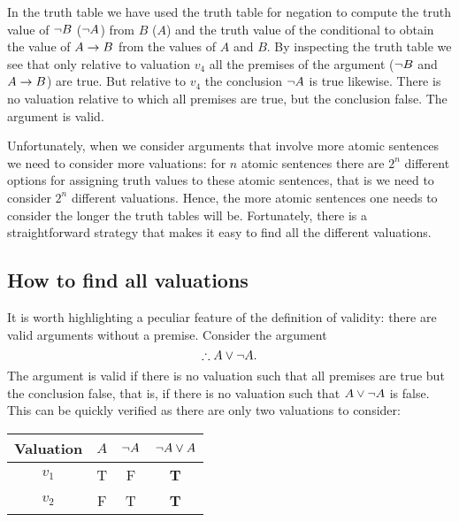 In the truth table we have used the truth table for negation to compute the truth value of $\neg B$ ($\neg A$) from $B$ ($A$) and the truth value of the conditional to obtain the value of $A\rightarrow B$ from the values of $A$ and $B$. By inspecting the truth table we see that only relative to valuation $v_4$ all the premises of the argument ($\neg B$ and $A\rightarrow B$) are true. But relative to $v_4$ the conclusion $\neg A$ is true likewise. There is no valuation relative to which all premises are true, but the conclusion false. The argument is valid.

Unfortunately, when we consider arguments that involve more atomic sentences we need to consider more valuations: for $n$ atomic sentences there are $2^n$ different options for assigning truth values to these atomic sentences, that is we need to consider $2^n$ different valuations. Hence, the more atomic sentences one needs to consider the longer the truth tables will be. Fortunately, there is a straightforward strategy that makes it easy to find all the different valuations.

\subsection{How to find all valuations}

It is worth highlighting a peculiar feature of the definition of validity: there are valid arguments without a premise. Consider the argument
$$\therefore A\eor\enot A.$$
The argument is valid if there is no valuation such that all premises are true but the conclusion false, that is, if there is no valuation such that $A\vee\neg A$ is false. This can be quickly verified as there are only two valuations to consider:

 \begin{center}
\begin{tabular}{c|c|c||c}
Valuation&$A$&$\neg A$&$\neg A\vee A$\\\hline
$v_1$&T & F & \textbf{T}\\
$v_2$&F & T & \textbf{T}
\end{tabular}
\end{center}

